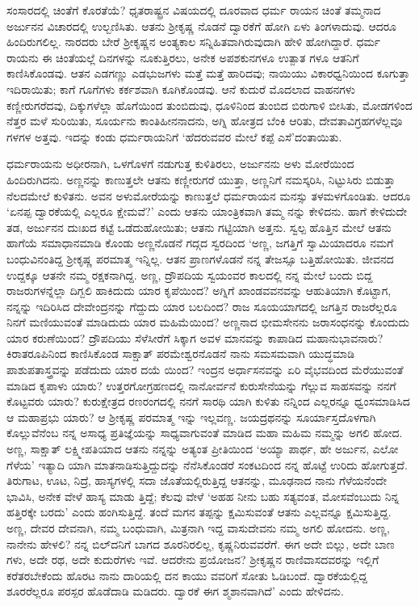 ಸಂಸಾರದಲ್ಲಿ ಚಿಂತೆಗೆ ಕೊರತೆಯೆ? ಧೃತರಾಷ್ಟ್ರನ ವಿಷಯದಲ್ಲಿ ದೂರವಾದ ಧರ್ಮ ರಾಯನ ಚಿಂತೆ ತಮ್ಮನಾದ ಅರ್ಜುನನ ವಿಚಾರದಲ್ಲಿ ಉಲ್ಬಣಿಸಿತು. ಆತನು ಶ್ರೀಕೃಷ್ಣ ನೊಡನೆ ದ್ವಾರಕೆಗೆ ಹೋಗಿ ಏಳು ತಿಂಗಳಾದುವು. ಆದರೂ ಹಿಂದಿರುಗಲಿಲ್ಲ. ನಾರದರು ಬೇರೆ ಶ್ರೀಕೃಷ್ಣನ ಅಂತ್ಯಕಾಲ ಸನ್ನಿಹಿತವಾಗಿರುವುದಾಗಿ ಹೇಳಿ ಹೋಗಿದ್ದಾರೆ. ಧರ್ಮ ರಾಯನು ಈ ಚಿಂತೆಯಲ್ಲೆ ದಿನಗಳನ್ನು ನೂಕುತ್ತಿರಲು, ಅನೇಕ ಅಪಶಕುನಗಳೂ ಉತ್ಪಾತ ಗಳೂ ಆತನಿಗೆ ಕಾಣಿಸಿಕೊಂಡವು. ಆತನ ಎಡಗಣ್ಣು ಎಡಭುಜಗಳು ಮತ್ತೆ ಮತ್ತೆ ಹಾರಿದವು; ನಾಯಿಯು ವಿಕಾರಧ್ವನಿಯಿಂದ ಕೂಗುತ್ತಾ ಇದಿರಾಯಿತು; ಕಾಗೆ ಗೂಗೆಗಳು ಕರ್ಕಶವಾಗಿ ಕೂಗಿಕೊಂಡವು. ಆನೆ ಕುದುರೆ ಮೊದಲಾದ ವಾಹನಗಳು ಕಣ್ಣೀರುಗರೆದವು, ದಿಕ್ಕುಗಳೆಲ್ಲಾ ಹೊಗೆಯಿಂದ ತುಂಬಿದುವು, ಧೂಳಿನಿಂದ ತುಂಬಿದ ಬಿರುಗಾಳಿ ಬೀಸಿತು, ಮೋಡಗಳಿಂದ ನೆತ್ತರ ಮಳೆ ಸುರಿಯಿತು, ಸೂರ್ಯನು ಕಾಂತಿಹೀನನಾದನು, ಅಗ್ನಿ ಹೋತ್ರದ ಬೆಂಕಿ ಆರಿತು, ದೇವತಾವಿಗ್ರಹಗಳೆಲ್ಲವೂ ಗಳಗಳ ಅತ್ತವು. ಇದನ್ನು ಕಂಡು ಧರ್ಮರಾಯನಿಗೆ ‘ಹೆದರುವವರ ಮೇಲೆ ಕಪ್ಪೆ ಎಸೆ’ದಂತಾಯಿತು.

ಧರ್ಮರಾಯನು ಅಧೀರನಾಗಿ, ಒಳಗೊಳಗೆ ನಡುಗುತ್ತ ಕುಳಿತಿರಲು, ಅರ್ಜುನನು ಅಳು ಮೋರೆಯಿಂದ ಹಿಂದಿರುಗಿದನು. ಅಣ್ಣನನ್ನು ಕಾಣುತ್ತಲೇ ಆತನು ಕಣ್ಣೀರುಗರೆ ಯುತ್ತಾ, ಅಣ್ಣನಿಗೆ ನಮಸ್ಕರಿಸಿ, ನಿಟ್ಟುಸಿರು ಬಿಡುತ್ತಾ ನೆಲದಮೇಲೆ ಕುಳಿತನು. ಅವನ ಅಳುಮೋರೆಯನ್ನು ಕಾಣುತ್ತಲೆ ಧರ್ಮರಾಯನ ಮನಸ್ಸು ತಳಮಳಗೊಂಡಿತು. ಆದರೂ ‘ಏನಪ್ಪ ದ್ವಾರಕೆಯಲ್ಲಿ ಎಲ್ಲರೂ ಕ್ಷೇಮವೆ?’ ಎಂದು ಆತನು ಯಾಂತ್ರಿಕವಾಗಿ ತಮ್ಮ ನನ್ನು ಕೇಳಿದನು. ಹಾಗೆ ಕೇಳಿದುದೇ ತಡ, ಅರ್ಜುನನ ದುಃಖದ ಕಟ್ಟೆ ಒಡೆದುಹೋಯಿತು; ಆತನು ಗಟ್ಟಿಯಾಗಿ ಅತ್ತನು. ಸ್ವಲ್ಪ ಹೊತ್ತಿನ ಮೇಲೆ ಆತನು ಹಾಗೆಯೆ ಸಮಾಧಾನಮಾಡಿ ಕೊಂಡು ಅಣ್ಣನೊಡನೆ ಗದ್ಗದ ಸ್ವರದಿಂದ ‘ಅಣ್ಣ, ಜಗತ್ತಿಗೆ ಸ್ವಾಮಿಯಾದರೂ ನಮಗೆ ಬಂಧುವಿನಂತಿದ್ದ ಶ್ರೀಕೃಷ್ಣ ಪರಮಾತ್ಮ ಇನ್ನಿಲ್ಲ. ಆತನ ಪ್ರಾಣಗಳೊಡನೆ ನನ್ನ ತೇಜಸ್ಸೂ ಬತ್ತಿಹೋಯಿತು. ಜೀವನದ ಉದ್ದಕ್ಕೂ ಆತನೇ ನಮ್ಮ ರಕ್ಷಕನಾಗಿದ್ದ. ಅಣ್ಣ, ದ್ರೌಪದಿಯ ಸ್ವಯಂವರ ಕಾಲದಲ್ಲಿ ನನ್ನ ಮೇಲೆ ಬಂದು ಬಿದ್ದ ರಾಜರುಗಳನ್ನೆಲ್ಲಾ ದಿಗ್ಬಲಿ ಹಾಕಿದುದು ಯಾರ ಕೃಪೆಯಿಂದ? ಅಗ್ನಿಗೆ ಖಾಂಡವವನವನ್ನು ಆಹುತಿಯಾಗಿ ಕೊಟ್ಟಾಗ, ನನ್ನನ್ನು ಇದಿರಿಸಿದ ದೇವೇಂದ್ರನನ್ನು ಗೆದ್ದುದು ಯಾರ ಬಲದಿಂದ? ರಾಜ ಸೂಯಯಾಗದಲ್ಲಿ ಜಗತ್ತಿನ ರಾಜರೆಲ್ಲರೂ ನಿನಗೆ ಮಣಿಯುವಂತೆ ಮಾಡಿದುದು ಯಾರ ಮಹಿಮೆಯಿಂದ? ಅಣ್ಣನಾದ ಭೀಮಸೇನನು ಜರಾಸಂಧನನ್ನು ಕೊಂದುದು ಯಾರ ಕರುಣೆಯಿಂದ? ದ್ರೌಪದಿಯು ಸೆಳೆಸೀರೆಗೆ ಸಿಕ್ಕಾಗ ಅವಳ ಮಾನವನ್ನು ಕಾಪಾಡಿದ ಮಹಾನುಭಾವನಾರು? ಕಿರಾತರೂಪಿನಿಂದ ಕಾಣಿಸಿಕೊಂಡ ಸಾಕ್ಷಾತ್ ಪರಮೇಶ್ವರನೊಡನೆ ನಾನು ಸಮಸಮವಾಗಿ ಯುದ್ಧಮಾಡಿ ಪಾಶುಪತಾಸ್ತ್ರವನ್ನು ಪಡೆದುದು ಯಾರ ದಯೆ ಯಿಂದ? ಇಂದ್ರನ ಅರ್ಧಾಸನವನ್ನು ಏರಿ ವೈಭವದಿಂದ ಮೆರೆಯುವಂತೆ ಮಾಡಿದ ಕೃಪಾಳು ಯಾರು? ಉತ್ತರಗೋಗ್ರಹಣದಲ್ಲಿ ನಾನೋರ್ವನೆ ಕುರುಸೇನೆಯನ್ನು ಗೆಲ್ಲುವ ಸಾಹಸವನ್ನು ನನಗೆ ಕೊಟ್ಟವರು ಯಾರು? ಕುರುಕ್ಷೇತ್ರದ ರಣರಂಗದಲ್ಲಿ ನನಗೆ ಸಾರಥಿ ಯಾಗಿ ಕುಳಿತು ನನ್ನಿಂದ ಎಲ್ಲರನ್ನೂ ಧ್ವಂಸಮಾಡಿಸಿದ ಆ ಮಹಾಪ್ರಭು ಯಾರು? ಆ ಶ್ರೀಕೃಷ್ಣ ಪರಮಾತ್ಮ ಇನ್ನು ಇಲ್ಲವಣ್ಣ. ಜಯದ್ರಥನನ್ನು ಸೂರ್ಯಾಸ್ತದೊಳಗಾಗಿ ಕೊಲ್ಲುವೆನೆಂಬ ನನ್ನ ಅಸಾಧ್ಯ ಪ್ರತಿಜ್ಞೆಯನ್ನು ಸಾಧ್ಯವಾಗುವಂತೆ ಮಾಡಿದ ಮಹಾ ಮಹಿಮ ನಮ್ಮನ್ನು ಅಗಲಿ ಹೋದ. ಅಣ್ಣ, ಸಾಕ್ಷಾತ್ ಲಕ್ಷ್ಮೀಪತಿಯಾದ ಆತನು ನನ್ನನ್ನು ಅತ್ಯಂತ ಪ್ರೀತಿಯಿಂದ ‘ಅಯ್ಯಾ ಪಾರ್ಥ, ಹೇ ಅರ್ಜುನ, ಎಲೋ ಗೆಳೆಯ’ ಇತ್ಯಾದಿ ಯಾಗಿ ಮಾತನಾಡಿಸುತ್ತಿದ್ದುದನ್ನು ನೆನೆಸಿಕೊಂಡರೆ ಸಂಕಟದಿಂದ ನನ್ನ ಹೊಟ್ಟೆ ಉರಿದು ಹೋಗುತ್ತದೆ. ತಿರುಗಾಟ, ಊಟ, ನಿದ್ರೆ, ಹಾಸ್ಯಗಳಲ್ಲಿ ಸದಾ ಜೊತೆಯಲ್ಲಿರುತ್ತಿದ್ದ ಆತನನ್ನು, ಮೂಢನಾದ ನಾನು ಗೆಳೆಯನೆಂದೇ ಭಾವಿಸಿ, ಅನೇಕ ವೇಳೆ ಹಾಸ್ಯ ಮಾಡು ತ್ತಿದ್ದೆ; ಕೆಲವು ವೇಳೆ ‘ಅಹಹ ನೀನು ಬಹು ಸತ್ಯವಂತ, ಮೋಸವೆಂಬುದು ನಿನ್ನ ಹತ್ತಿರಕ್ಕೇ ಬರದು’ ಎಂದು ಹಂಗಿಸುತ್ತಿದ್ದೆ. ತಂದೆ ಮಗನ ತಪ್ಪನ್ನು ಕ್ಷಮಿಸುವಂತೆ ಆತನು ಎಲ್ಲವನ್ನೂ ಕ್ಷಮಿಸುತ್ತಿದ್ದ. ಅಣ್ಣ, ದೇವರ ದೇವನಾಗಿ, ನಮ್ಮ ಬಂಧುವಾಗಿ, ಮಿತ್ರನಾಗಿ ಇದ್ದ ವಾಸುದೇವನು ನಮ್ಮ ಅಗಲಿ ಹೋದನು. ಅಣ್ಣ, ನಾನೇನು ಹೇಳಲಿ? ನನ್ನ ಬಿಲ್​ದನಿಗೆ ಬಾಗದ ಶೂರನಿರಲಿಲ್ಲ, ಕೃಷ್ಣನಿರುವವರೆಗೆ. ಈಗ ಅದೇ ಬಿಲ್ಲು, ಅದೇ ಬಾಣ ಗಳು, ಅದೇ ರಥ, ಅದೇ ಕುದುರೆಗಳು ಇವೆ. ಆದರೇನು ಪ್ರಯೋಜನ? ಶ್ರೀಕೃಷ್ಣನ ರಾಣಿವಾಸದವರನ್ನು ಇಲ್ಲಿಗೆ ಕರೆತರಬೇಕೆಂದು ಹೊರಟ ನಾನು ದಾರಿಯಲ್ಲಿ ದನ ಕಾಯು ವವರಿಗೆ ಸೋತು ಓಡಿಬಂದೆ. ದ್ವಾರಕೆಯಲ್ಲಿದ್ದ ಶೂರರೆಲ್ಲರೂ ಪರಸ್ಪರ ಹೊಡೆದಾಡಿ ಮಡಿದರು. ದ್ವಾರಕೆ ಈಗ ಶ್ಮಶಾನವಾಗಿದೆ’ ಎಂದು ಹೇಳಿದನು.

